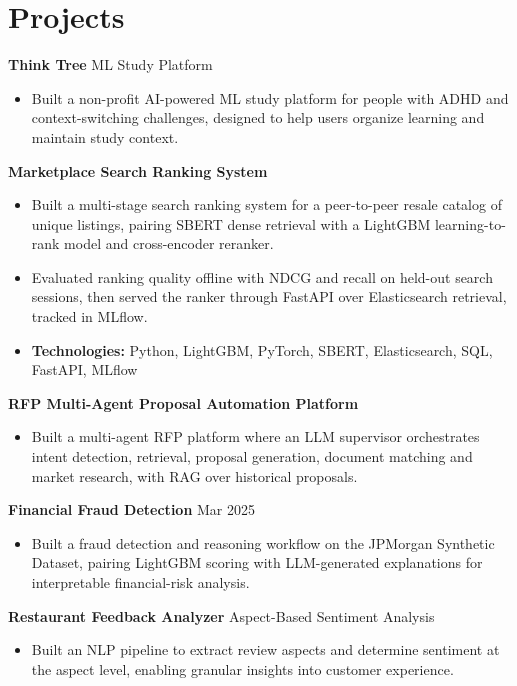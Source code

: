 \documentclass[10pt,a4paper]{article}
\begin{document}
\section{Projects}
\textbf{Think Tree} \textbar{} ML Study Platform\par
\begin{itemize}
  \item Built a non-profit AI-powered ML study platform for people with ADHD and context-switching challenges, designed to help users organize learning and maintain study context.
\end{itemize}
\textbf{Marketplace Search Ranking System}\par
\begin{itemize}
  \item Built a multi-stage search ranking system for a peer-to-peer resale catalog of unique listings, pairing SBERT dense retrieval with a LightGBM learning-to-rank model and cross-encoder reranker.
  \item Evaluated ranking quality offline with NDCG and recall on held-out search sessions, then served the ranker through FastAPI over Elasticsearch retrieval, tracked in MLflow.
  \item \textbf{Technologies:} Python, LightGBM, PyTorch, SBERT, Elasticsearch, SQL, FastAPI, MLflow
\end{itemize}
\textbf{RFP Multi-Agent Proposal Automation Platform}\par
\begin{itemize}
  \item Built a multi-agent RFP platform where an LLM supervisor orchestrates intent detection, retrieval, proposal generation, document matching and market research, with RAG over historical proposals.
\end{itemize}
\textbf{Financial Fraud Detection} \textbar{} Mar 2025\par
\begin{itemize}
  \item Built a fraud detection and reasoning workflow on the JPMorgan Synthetic Dataset, pairing LightGBM scoring with LLM-generated explanations for interpretable financial-risk analysis.
\end{itemize}
\textbf{Restaurant Feedback Analyzer} \textbar{} Aspect-Based Sentiment Analysis\par
\begin{itemize}
  \item Built an NLP pipeline to extract review aspects and determine sentiment at the aspect level, enabling granular insights into customer experience.
\end{itemize}
\end{document}

